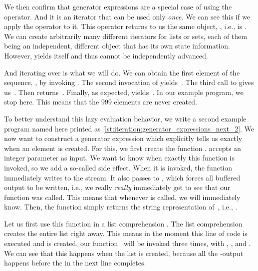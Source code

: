 We then confirm that generator expressions are a special case of  using the  operator.
And it is an iterator that can be used only \emph{once}.
We can see this if we apply the  operator to it.
This operator returns to us the same object, , i.e.,  is .
We can create arbitrarily many different iterators for lists or sets, each of them being an independent, different object that has its own state information.
However,  yields  itself and thus cannot be independently advanced.

And iterating over  is what we will do.
We can obtain the first element of the sequence, , by invoking .
The second invocation of  yields~.
The third call to  gives us~.
Then  returns~.
Finally, as expected,  yields~.
In our example program, we stop here.
This means that the 999 elements are never created.

To better understand this lazy evaluation behavior, we write a second example program named  here printed as \cref{lst:iteration:generator_expressions_next_2}.
We now want to construct a generator expression which explicitly tells us exactly when an element is created.
For this, we first create the function .
 accepts an integer parameter  as input.
We want to know when exactly this function is invoked, so we add a so-called side effect.
When it is invoked, the function immediately writes  to the  stream.
It also passes  to , which forces all buffered output to be written, i.e., we really \emph{really} immediately get to see that our function was called.
This means that whenever  is called, we will immediately know.
Then, the function simply returns the string representation of~, i.e., .

Let us first use this function in a list comprehension .
The list comprehension creates the entire list right away.
This means in the moment this line of code is executed and  is created, our function~ will be invoked three times, with , , and .
We can see that this happens when the list is created, because all the -output happens before the  in the next line completes.

